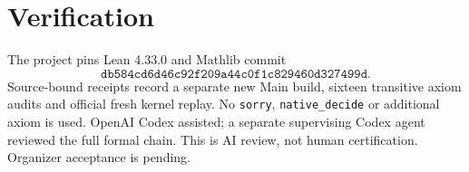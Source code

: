 \documentclass[11pt]{article}
\begin{document}
\section{Verification}
The project pins Lean 4.33.0 and Mathlib commit
\[
\texttt{db584cd6d46c92f209a44c0f1c829460d327499d}.
\]
Source-bound receipts record a separate new Main build, sixteen
transitive axiom audits and official fresh kernel replay. No
\texttt{sorry}, \texttt{native\_decide} or additional axiom is used.
OpenAI Codex assisted; a separate supervising Codex agent reviewed
the full formal chain. This is AI review, not human certification.
Organizer acceptance is pending.
\end{document}
